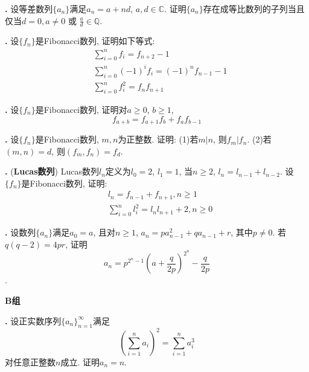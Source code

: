 \par \textbf{\theprobseq .} \cite{SMI} 设等差数列$\{a_n\}$满足$a_n=a+nd$, $a,d\in \mathbb{C}$. 证明$\{a_n\}$存在成等比数列的子列当且仅当$d=0, a\neq 0$ 或 $\frac{a}{d}\in \mathbb{Q}$. 

\par \textbf{\theprobseq .} 设$\{f_n\}$是Fibonacci数列, 证明如下等式:
\begin{align}
    &\sum_{i=0}^n f_i = f_{n+2}-1\\
    &\sum_{i=0}^n (-1)^i f_i = (-1)^n f_{n-1} - 1\\
    &\sum_{i=0}^n f^2_i = f_nf_{n+1}
\end{align}

\par \textbf{\theprobseq .} 设$\{f_n\}$是Fibonacci数列, 证明对$a\ge 0$, $b\ge 1$, 
\begin{equation}
    f_{a+b} = f_{a+1}f_{b} + f_{a}f_{b-1}
    \label{eq:fibo_part}
\end{equation}

\par \textbf{\theprobseq .} 设$\{f_n\}$是Fibonacci数列, $m,n$为正整数. 证明: (1)若$m|n$, 则$f_m|f_n$. (2)若$(m,n)=d$, 则$(f_m,f_n)=f_d$. 


\par \textbf{\theprobseq .} (\textbf{Lucas数列}) Lucas数列${l_n}$定义为$l_0=2$, $l_1=1$, 当$n\ge 2$, $l_n=l_{n-1}+l_{n-2}$. 设$\{f_n\}$是Fibonacci数列, 证明: 
\begin{align}
    &l_n = f_{n-1} + f_{n+1}, n\ge 1\\
    &\sum_{i=0}^n l_i^2 = l_nl_{n+1}+2, n\ge 0
\end{align}


\par \textbf{\theprobseq .} 设数列$\{a_n\}$满足$a_0=a$, 且对$n\ge 1$, $a_n=pa_{n-1}^2+qa_{n-1}+r$, 其中$p\neq 0$. 若$q(q-2)=4pr$, 证明$$a_n=p^{2^{n}-1}\left(a+\frac{q}{2p}\right)^{2^n}-\frac{q}{2p}$$. 


\par \textbf{B组}

\par \textbf{\theprobseq .} \cite{SMI} 设正实数序列$\{a_n\}_{n=1}^{\infty}$满足
\begin{equation}
    \left(\sum_{i=1}^n a_i\right)^2=\sum_{i=1}^n a_i^3
\end{equation}
对任意正整数$n$成立. 证明$a_n=n$. 

